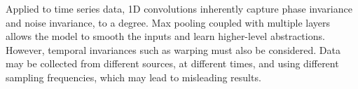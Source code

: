     Applied to time series data, 1D convolutions inherently capture phase invariance and noise invariance, to a degree.
    Max pooling coupled with multiple layers allows the model to smooth the inputs and learn higher-level abstractions.
    However, temporal invariances such as warping must also be considered. Data may be collected from different sources, at different times, and using different sampling frequencies, which may lead to misleading results.

